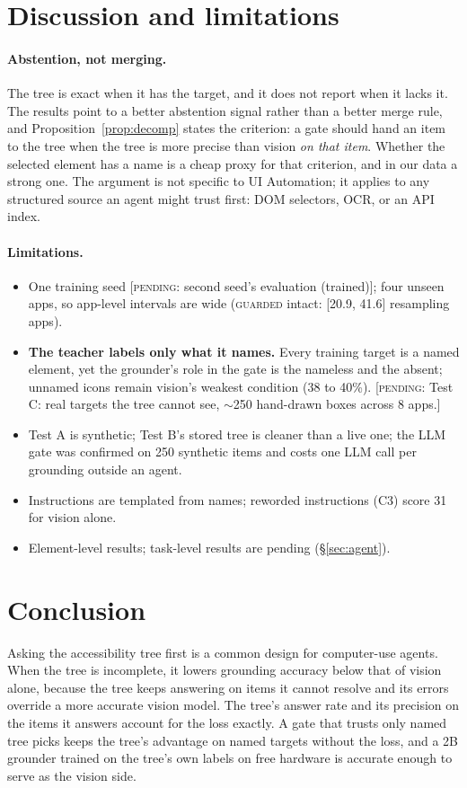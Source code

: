 \documentclass[11pt]{article}
\newcommand{\pending}[1]{\textcolor{red!70!black}{[\textsc{pending}: #1]}}
\begin{document}
\section{Discussion and limitations}

\paragraph{Abstention, not merging.} The tree is exact when it has the target, and it does not report
when it lacks it. The results point to a better abstention signal rather than a better merge rule, and
Proposition~\ref{prop:decomp} states the criterion: a gate should hand an item to the tree when the tree
is more precise than vision \emph{on that item}. Whether the selected element has a name is a cheap proxy
for that criterion, and in our data a strong one. The argument is not specific to UI
Automation; it applies to any structured source an agent might trust first: DOM selectors, OCR, or an API
index.

\paragraph{Limitations.}
\begin{itemize}[leftmargin=*,itemsep=1pt]
\item One training seed \pending{second seed's evaluation (trained)}; four unseen apps, so app-level
intervals are wide (\textsc{guarded} intact: [20.9, 41.6] resampling apps).
\item \textbf{The teacher labels only what it names.} Every training target is a named element, yet the
grounder's role in the gate is the nameless and the absent; unnamed icons remain vision's weakest condition
(38 to 40\%). \pending{Test C: real targets the tree cannot see, $\sim$250 hand-drawn boxes across 8 apps.}
\item Test A is synthetic; Test B's stored tree is cleaner than a live one; the LLM gate was confirmed on
250 synthetic items and costs one LLM call per grounding outside an agent.
\item Instructions are templated from names; reworded instructions (C3) score 31 for vision alone.
\item Element-level results; task-level results are pending (\S\ref{sec:agent}).
\end{itemize}

\section{Conclusion}
Asking the accessibility tree first is a common design for computer-use agents. When the tree is
incomplete, it lowers grounding accuracy below that of vision alone, because the tree keeps answering on
items it cannot resolve and its errors override a more accurate vision model. The tree's answer rate and
its precision on the items it answers account for the loss exactly. A gate that trusts only named tree
picks keeps the tree's advantage on named targets without the loss, and a 2B grounder trained on the tree's
own labels on free hardware is accurate enough to serve as the vision side.
\end{document}
